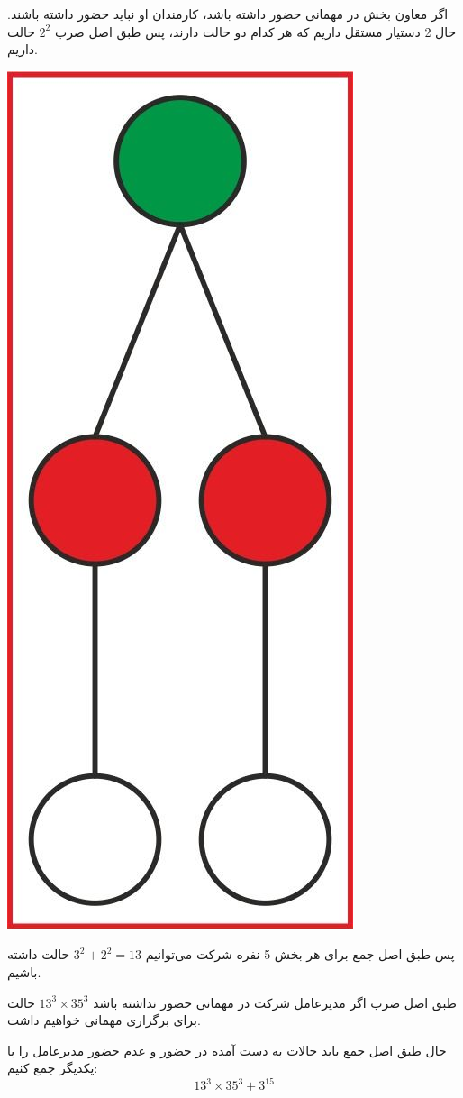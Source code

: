     اگر معاون بخش در مهمانی حضور داشته باشد، کارمندان او نباید حضور داشته باشند. حال 2 دستیار مستقل داریم که هر کدام دو حالت دارند، پس طبق اصل ضرب $2^2$ حالت داریم.
    \begin{center}
    	\includegraphics[scale=0.1]{./7.jpg}
    \end{center}
    
    پس طبق اصل جمع برای هر بخش 5 نفره شرکت می‌توانیم $ 3^2 + 2^2 = 13 $ حالت داشته باشیم.
    
\p
طبق اصل ضرب اگر مدیرعامل شرکت در مهمانی حضور نداشته باشد $ 13^3 \times  35 ^ 3 $ حالت برای برگزاری مهمانی خواهیم داشت.
    
\p
حال طبق اصل جمع باید حالات به دست آمده در حضور و عدم حضور مدیرعامل را با یکدیگر جمع کنیم:   
    $$13^3 \times  35 ^ 3  + 3^{15}$$
